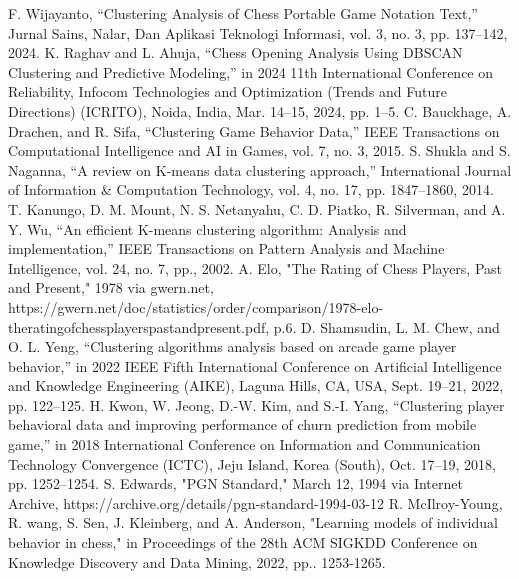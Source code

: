 \documentclass[conference]{IEEEtran}
\begin{document}
\begin{thebibliography}{00}
 F. Wijayanto, “Clustering Analysis of Chess Portable Game Notation Text,” Jurnal Sains, Nalar, Dan Aplikasi Teknologi Informasi, vol. 3, no. 3, pp. 137–142, 2024.
K. Raghav and L. Ahuja, “Chess Opening Analysis Using DBSCAN Clustering and Predictive Modeling,” in 2024 11th International Conference on Reliability, Infocom Technologies and Optimization (Trends and Future Directions) (ICRITO), Noida, India, Mar. 14–15, 2024, pp. 1–5.
 C. Bauckhage, A. Drachen, and R. Sifa, “Clustering Game Behavior Data,” IEEE Transactions on Computational Intelligence and AI in Games, vol. 7, no. 3, 2015.
 S. Shukla and S. Naganna, “A review on K-means data clustering approach,” International Journal of Information \& Computation Technology, vol. 4, no. 17, pp. 1847–1860, 2014.
 T. Kanungo, D. M. Mount, N. S. Netanyahu, C. D. Piatko, R. Silverman, and A. Y. Wu, “An efficient K-means clustering algorithm: Analysis and implementation,” IEEE Transactions on Pattern Analysis and Machine Intelligence, vol. 24, no. 7, pp., 2002.
 A. Elo, "The Rating of Chess Players, Past and Present," 1978 via gwern.net, https://gwern.net/doc/statistics/order/comparison/1978-elo-theratingofchessplayerspastandpresent.pdf, p.6.
 D. Shamsudin, L. M. Chew, and O. L. Yeng, “Clustering algorithms analysis based on arcade game player behavior,” in 2022 IEEE Fifth International Conference on Artificial Intelligence and Knowledge Engineering (AIKE), Laguna Hills, CA, USA, Sept. 19–21, 2022, pp. 122–125.
 H. Kwon, W. Jeong, D.-W. Kim, and S.-I. Yang, “Clustering player behavioral data and improving performance of churn prediction from mobile game,” in 2018 International Conference on Information and Communication Technology Convergence (ICTC), Jeju Island, Korea (South), Oct. 17–19, 2018, pp. 1252–1254.
 S. Edwards, "PGN Standard," March 12, 1994 via Internet Archive, https://archive.org/details/pgn-standard-1994-03-12
 R. McIlroy-Young, R. wang, S. Sen, J. Kleinberg, and A. Anderson, "Learning models of individual behavior in chess," in Proceedings of the 28th ACM SIGKDD Conference on Knowledge Discovery and Data Mining, 2022, pp.. 1253-1265.
\end{thebibliography}
\end{document}

